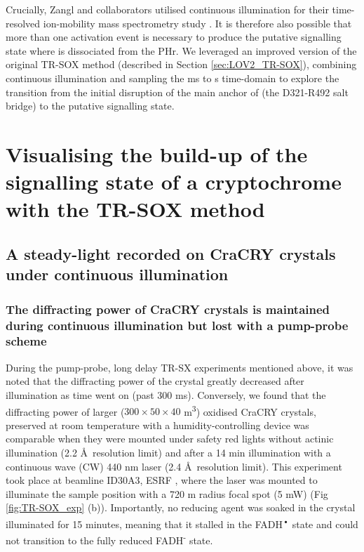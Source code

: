 Crucially, Zangl and collaborators utilised continuous illumination for their time-resolved ion-mobility mass spectrometry study \parencite{zanglTimeResolvedIonMobility2024}. It is therefore also possible that more than one activation event is necessary to produce the putative signalling state where  is dissociated from the PHr. 
\vspace{2mm}
We leveraged an improved version of the original TR-SOX method (described in Section \ref{sec:LOV2_TR-SOX}), combining continuous illumination and sampling the ms to s time-domain to explore the transition from the initial disruption of the main anchor of  (the D321-R492 salt bridge) to the putative signalling state. 


\chapter{Visualising the build-up of the signalling state of a cryptochrome with the TR-SOX method}\label{chap:CraCRY_TR-SOX}

\section{A steady-light recorded on CraCRY crystals under continuous illumination}

\subsection{The diffracting power of CraCRY crystals is maintained during continuous illumination but lost with a pump-probe scheme}
During the pump-probe, long delay TR-SX experiments mentioned above, it was noted that the diffracting power of the crystal greatly decreased after illumination as time went on (past 300 ms). Conversely, we found that the diffracting power of larger (\(300 \times 50 \times 40\) \textmu m\textsuperscript{3}) oxidised CraCRY crystals, preserved at room temperature with a humidity-controlling device \parencite{sanchez-weatherbyImprovingDiffractionHumidity2009} was comparable when they were mounted under safety red lights without actinic illumination (2.2 \AA\ resolution limit) and after a 14 min illumination with a continuous wave (CW) 440 nm laser (2.4 \AA\ resolution limit). This experiment took place at beamline ID30A3, ESRF \parencite{vonstettenID30A3MASSIF3Beamline2020}, where the laser was mounted to illuminate the sample position with a 720 \textmu m radius focal spot (5 mW) (Fig \ref{fig:TR-SOX_exp} (b)). Importantly, no reducing agent was soaked in the crystal illuminated for 15 minutes, meaning that it stalled in the FADH\textsuperscript{•} state and could not transition to the fully reduced FADH\textsuperscript{-} state\parencite{lacombatUltrafastOxidationTyrosine2019}.

